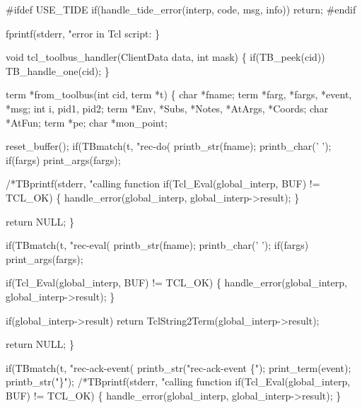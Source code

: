 #ifdef USE_TIDE
  if(handle_tide_error(interp, code, msg, info))
    return;
#endif

  fprintf(stderr, "error in Tcl script: %
\}
\nwendcode{}\nwdocspar


\nwenddocs{}\endmoddef\let\nwnotused=\nwoutput{}
void tcl_toolbus_handler(ClientData data, int mask)
\{
  if(TB_peek(cid))
    TB_handle_one(cid);
\}
\nwendcode{}\nwdocspar



\nwenddocs{}\endmoddef\let\nwnotused=\nwoutput{}
term *from_toolbus(int cid, term *t) 
\{
  char *fname;
  term *farg, *fargs, *event, *msg;
  int i, pid1, pid2;
  term *Env, *Subs, *Notes, *AtArgs, *Coords;
  char *AtFun;
  term *pe;
  char *mon_point;
 
  reset_buffer();
  if(TBmatch(t, "rec-do(%
    printb_str(fname);
    printb_char(' ');
    if(fargs)
      print_args(fargs);
    
    /*TBprintf(stderr, "calling function %
    if(Tcl_Eval(global_interp, BUF) != TCL_OK) \{
      handle_error(global_interp, global_interp->result);
    \}

    return NULL;
  \}
  
  if(TBmatch(t, "rec-eval(%
    printb_str(fname);
    printb_char(' ');
    if(fargs)
      print_args(fargs);

    if(Tcl_Eval(global_interp, BUF) != TCL_OK) \{
      handle_error(global_interp, global_interp->result);
    \}

    if(global_interp->result)
      return TclString2Term(global_interp->result);

    return NULL;
  \}

  if(TBmatch(t, "rec-ack-event(%
    printb_str("rec-ack-event \{");
    print_term(event);
    printb_str("\}");
    /*TBprintf(stderr, "calling function %
    if(Tcl_Eval(global_interp, BUF) != TCL_OK) \{
      handle_error(global_interp, global_interp->result);
    \}

